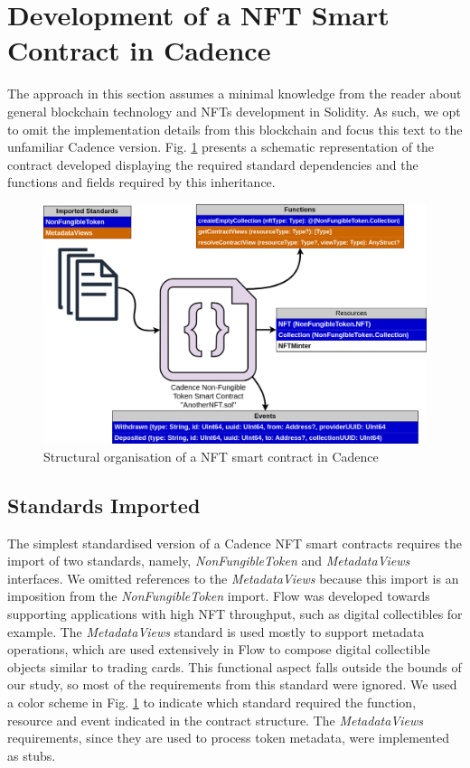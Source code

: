 \documentclass[../NFTComp_IEEE.tex]{subfiles}
\begin{document}
\section{Development of a NFT Smart Contract in Cadence}
\label{sec:cadence_development}
The approach in this section assumes a minimal knowledge from the reader about general blockchain technology and NFTs development in Solidity. As such, we opt to omit the implementation details from this blockchain and focus this text to the unfamiliar Cadence version. Fig. \ref{fig:cadence_nft_contract} presents a schematic representation of the contract developed displaying the required standard dependencies and the functions and fields required by this inheritance.

\begin{figure}[h!]
    \centering
    \includegraphics[width=\columnwidth]{Images/almei1.png}
    \caption{Structural organisation of a NFT smart contract in Cadence}
    \label{fig:cadence_nft_contract}
\end{figure}

\subsection{Standards Imported}
The simplest standardised version of a Cadence NFT smart contracts requires the import of two standards, namely, \textit{NonFungibleToken} and \textit{MetadataViews} interfaces. We omitted references to the \textit{MetadataViews} because this import is an imposition from the \textit{NonFungibleToken} import. Flow was developed towards supporting applications with high NFT throughput, such as digital collectibles for example. The \textit{MetadataViews} standard is used mostly to support metadata operations, which are used extensively in Flow to compose digital collectible objects similar to trading cards. This functional aspect falls outside the bounds of our study, so most of the requirements from this standard were ignored. We used a color scheme in Fig. \ref{fig:cadence_nft_contract} to indicate which standard required the function, resource and event indicated in the contract structure. The \textit{MetadataViews} requirements, since they are used to process token metadata, were implemented as stubs.
\end{document}
